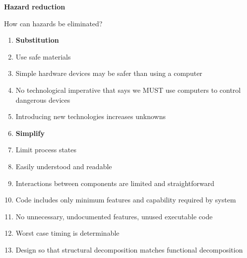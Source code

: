 \documentclass[aspectratio=1610,pdftex,dvipsnames,compress,xcolor={dvipsnames}]{beamer}
\begin{document}
\begin{frame}[plain]{}
    \centering\LARGE\textbf{Hazard reduction}
\end{frame}


\addtocounter{framenumber}{-1}
\begin{frame}{How can hazards be eliminated?}
    \begin{enumerate}[series=outerlist,topsep=0pt,itemsep=1pt,leftmargin=*,label=(\arabic*)]
        \item[]\textbf{Substitution}
        \item[]Use safe materials  
        \item[]Simple hardware devices may be safer than using a computer
        \item[]No technological imperative that says we MUST use computers to control dangerous devices  
        \item[]Introducing new technologies increases unknowns
            \vspace{0.05in}
        \item[]\textbf{Simplify}
        \item[]Limit process states  
        \item[]Easily understood and readable  
        \item[]Interactions between components are limited and straightforward  
        \item[]Code includes only minimum features and capability required by system  
        \item[]No unnecessary, undocumented features, unused executable code  
        \item[]Worst case timing is determinable  
        \item[]Design so that structural decomposition matches functional decomposition
    \end{enumerate}
\end{frame}
\end{document}

